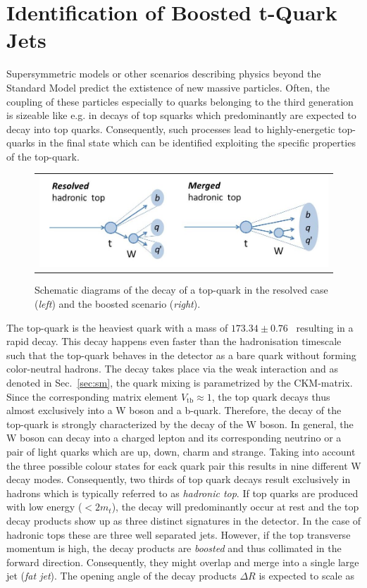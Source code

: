 \section{Identification of Boosted t-Quark Jets }
\label{sec:boosted_tops}
Supersymmetric models or other scenarios describing physics beyond the Standard Model predict the extistence of new massive particles. Often, the coupling of these particles especially to quarks belonging to the third generation is sizeable like e.g. in decays of top squarks which predominantly are expected to decay into top quarks. Consequently, such processes lead to highly-energetic top-quarks in the final state which can be identified exploiting the specific properties of the top-quark. \\
\begin{figure}[!tp]
  \centering 
  \begin{tabular}{c}
    \includegraphics[width=1.0\textwidth]{figures/BoostedTops.jpg} 
  \end{tabular}
  \caption{Schematic diagrams of the decay of a top-quark in the resolved case (\textit{left}) and the boosted scenario (\textit{right}).}
  \label{fig:boosted_top}
\end{figure}
The top-quark is the heaviest quark with a mass of $173.34 \pm 0.76$\gev~\cite{ATLAS:2014wva} resulting in a rapid decay. This decay happens even faster than the hadronisation timescale such that the top-quark behaves in the detector as a bare quark without forming color-neutral hadrons. The decay takes place via the weak interaction and as denoted in Sec.~\ref{sec:sm}, the quark mixing is parametrized by the CKM-matrix. Since the corresponding matrix element $V_{\mathrm{tb}} \approx 1$, the top quark decays thus almost exclusively into a W boson and a b-quark. Therefore, the decay of the top-quark is strongly characterized by the decay of the W boson. In general, the W boson can decay into a charged lepton and its corresponding neutrino or a pair of light quarks which are up, down, charm and strange. Taking into account the three possible colour states for eack quark pair this results in nine different W decay modes. Consequently, two thirds of top quark decays result exclusively in hadrons which is typically referred to as \textit{hadronic top}. If top quarks are produced with low energy ($< 2 m_{t}$), the decay will predominantly occur at rest and the top decay products show up as three distinct signatures in the detector. In the case of hadronic tops these are three well separated jets. However, if the top transverse momentum is high, the decay products are \textit{boosted} and thus collimated in the forward direction. Consequently, they might overlap and merge into a single large jet (\textit{fat jet}). The opening angle of the decay products $\Delta R$ is expected to scale as
